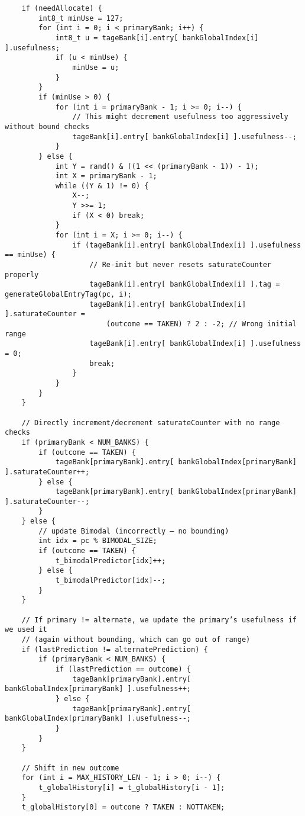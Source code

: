 \documentclass[11pt]{article}
\begin{document}
\begin{verbatim}
    if (needAllocate) {
        int8_t minUse = 127;
        for (int i = 0; i < primaryBank; i++) {
            int8_t u = tageBank[i].entry[ bankGlobalIndex[i] ].usefulness;
            if (u < minUse) {
                minUse = u;
            }
        }
        if (minUse > 0) {
            for (int i = primaryBank - 1; i >= 0; i--) {
                // This might decrement usefulness too aggressively without bound checks
                tageBank[i].entry[ bankGlobalIndex[i] ].usefulness--;
            }
        } else {
            int Y = rand() & ((1 << (primaryBank - 1)) - 1);
            int X = primaryBank - 1;
            while ((Y & 1) != 0) {
                X--;
                Y >>= 1;
                if (X < 0) break;
            }
            for (int i = X; i >= 0; i--) {
                if (tageBank[i].entry[ bankGlobalIndex[i] ].usefulness == minUse) {
                    // Re-init but never resets saturateCounter properly
                    tageBank[i].entry[ bankGlobalIndex[i] ].tag = generateGlobalEntryTag(pc, i);
                    tageBank[i].entry[ bankGlobalIndex[i] ].saturateCounter =
                        (outcome == TAKEN) ? 2 : -2; // Wrong initial range
                    tageBank[i].entry[ bankGlobalIndex[i] ].usefulness = 0;
                    break;
                }
            }
        }
    }

    // Directly increment/decrement saturateCounter with no range checks
    if (primaryBank < NUM_BANKS) {
        if (outcome == TAKEN) {
            tageBank[primaryBank].entry[ bankGlobalIndex[primaryBank] ].saturateCounter++;
        } else {
            tageBank[primaryBank].entry[ bankGlobalIndex[primaryBank] ].saturateCounter--;
        }
    } else {
        // update Bimodal (incorrectly – no bounding)
        int idx = pc % BIMODAL_SIZE;
        if (outcome == TAKEN) {
            t_bimodalPredictor[idx]++;
        } else {
            t_bimodalPredictor[idx]--;
        }
    }

    // If primary != alternate, we update the primary’s usefulness if we used it
    // (again without bounding, which can go out of range)
    if (lastPrediction != alternatePrediction) {
        if (primaryBank < NUM_BANKS) {
            if (lastPrediction == outcome) {
                tageBank[primaryBank].entry[ bankGlobalIndex[primaryBank] ].usefulness++;
            } else {
                tageBank[primaryBank].entry[ bankGlobalIndex[primaryBank] ].usefulness--;
            }
        }
    }

    // Shift in new outcome
    for (int i = MAX_HISTORY_LEN - 1; i > 0; i--) {
        t_globalHistory[i] = t_globalHistory[i - 1];
    }
    t_globalHistory[0] = outcome ? TAKEN : NOTTAKEN;


\end{verbatim}
\end{document}
